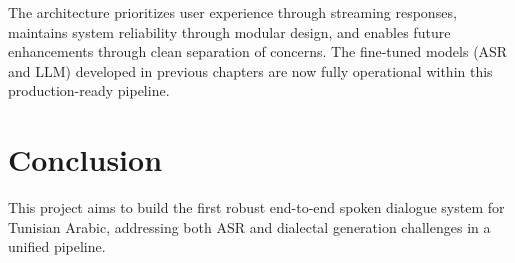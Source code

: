 \documentclass[12pt,a4paper]{report}
\begin{document}
The architecture prioritizes user experience through streaming responses, maintains system reliability through modular design, and enables future enhancements through clean separation of concerns. The fine-tuned models (ASR and LLM) developed in previous chapters are now fully operational within this production-ready pipeline.

\chapter{Conclusion}

This project aims to build the first robust end-to-end spoken dialogue system for Tunisian Arabic, addressing both ASR and dialectal generation challenges in a unified pipeline.



\end{document}
